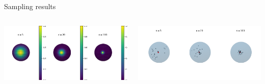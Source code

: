 \begin{frame}{Sampling results}
  \centering
  \begin{columns}
    \begin{column}{.5\textwidth}
      \includegraphics[width=\textwidth]{figures/vMF_density.png}
    \end{column}
    \begin{column}{.5\textwidth}
      \includegraphics[width=\textwidth]{figures/vMF_sampling_ours.png}
    \end{column}
  \end{columns}
\end{frame}